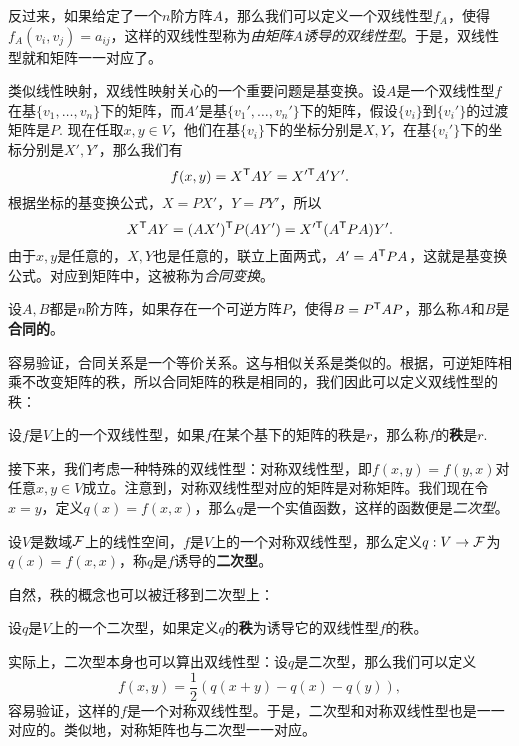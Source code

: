 反过来，如果给定了一个$n$阶方阵$A$，那么我们可以定义一个双线性型$f_A$，使得$f_A(v_i,v_j)=a_{ij}$，这样的双线性型称为\emph{由矩阵$A$诱导的双线性型}。于是，双线性型就和矩阵一一对应了。

类似线性映射，双线性映射关心的一个重要问题是基变换。设$A$是一个双线性型$f$在基$\{v_1,\dots,v_n\}$下的矩阵，而$A'$是基$\{v_1',\dots,v_n'\}$下的矩阵，假设$\{v_i\}$到$\{v_i'\}$的过渡矩阵是$P$. 现在任取$x,y\in V$，他们在基$\{v_i\}$下的坐标分别是$X,Y$，在基$\{v_i'\}$下的坐标分别是$X',Y'$，那么我们有
\[
    f(x,y)=X^{\mathsf{T}} AY=X'^{\mathsf{T}} A'Y'.
\]
根据坐标的基变换公式，$X=PX'$，$Y=PY'$，所以
\[
    X^{\mathsf{T}} AY=(AX')^{\mathsf{T}} P(AY')=X'^{\mathsf{T}} (A^{\mathsf{T}} P A)Y'.
\]
由于$x,y$是任意的，$X,Y$也是任意的，联立上面两式，$A'=A^{\mathsf{T}} P A$，这就是基变换公式。对应到矩阵中，这被称为\emph{合同变换}。

\begin{definition}[合同矩阵]\label{def:congruent-matrix}
    设$A,B$都是$n$阶方阵，如果存在一个可逆方阵$P$，使得$B=P^{\mathsf{T}} A P$，那么称$A$和$B$是\textbf{合同的}。
\end{definition}
容易验证，合同关系是一个等价关系。这与相似关系是类似的。根据，可逆矩阵相乘不改变矩阵的秩，所以合同矩阵的秩是相同的，我们因此可以定义双线性型的秩：

\begin{definition}[双线性型的秩]\label{def:bilinear-form-rank}
    设$f$是$V$上的一个双线性型，如果$f$在某个基下的矩阵的秩是$r$，那么称$f$的\textbf{秩}是$r$.
\end{definition}

接下来，我们考虑一种特殊的双线性型：对称双线性型，即$f(x,y)=f(y,x)$对任意$x,y\in V$成立。注意到，对称双线性型对应的矩阵是对称矩阵。我们现在令$x=y$，定义$q(x)=f(x,x)$，那么$q$是一个实值函数，这样的函数便是\emph{二次型}。

\begin{definition}[二次型]\label{def:quadratic-form}
    设$V$是数域$\mathcal{F}$上的线性空间，$f$是$V$上的一个对称双线性型，那么定义$q:V\to\mathcal{F}$为$q(x)=f(x,x)$，称$q$是$f$诱导的\textbf{二次型}。
\end{definition}

自然，秩的概念也可以被迁移到二次型上：
\begin{definition}[二次型的秩]\label{def:quadratic-form-rank}
设$q$是$V$上的一个二次型，如果定义$q$的\textbf{秩}为诱导它的双线性型$f$的秩。
\end{definition}

实际上，二次型本身也可以算出双线性型：设$q$是二次型，那么我们可以定义
\[f(x,y)=\frac{1}{2}(q(x+y)-q(x)-q(y)),\]
容易验证，这样的$f$是一个对称双线性型。于是，二次型和对称双线性型也是一一对应的。类似地，对称矩阵也与二次型一一对应。

